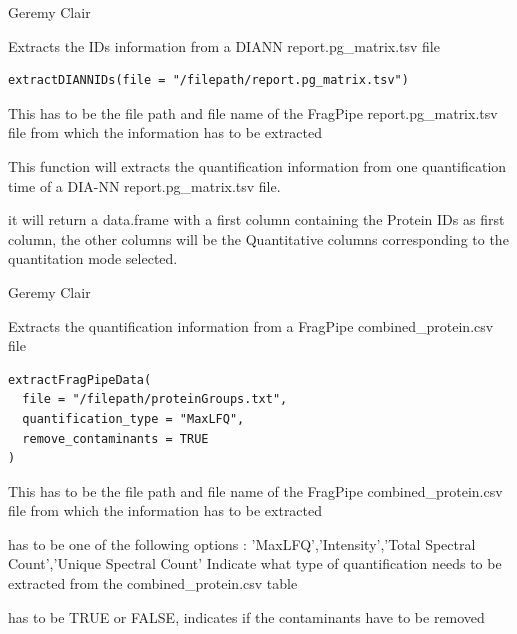 \documentclass[a4paper]{book}
\begin{document}
%
\begin{Author}
Geremy Clair
\end{Author}
%
\begin{Description}
Extracts the IDs information from a DIANN report.pg\_matrix.tsv file
\end{Description}
%
\begin{Usage}
\begin{verbatim}
extractDIANNIDs(file = "/filepath/report.pg_matrix.tsv")
\end{verbatim}
\end{Usage}
%
\begin{Arguments}
\begin{ldescription}
\item[\code{file}] This has to be the file path and file name of the FragPipe report.pg\_matrix.tsv file from which the information has to be extracted
\end{ldescription}
\end{Arguments}
%
\begin{Details}
This function will extracts the quantification information from one quantification time of a DIA-NN report.pg\_matrix.tsv file.
\end{Details}
%
\begin{Value}
it will return a data.frame with a first column containing the Protein IDs as first column, the other columns will be the Quantitative columns corresponding to the quantitation mode selected.
\end{Value}
%
\begin{Author}
Geremy Clair
\end{Author}
%
\begin{Description}
Extracts the quantification information from a FragPipe combined\_protein.csv file
\end{Description}
%
\begin{Usage}
\begin{verbatim}
extractFragPipeData(
  file = "/filepath/proteinGroups.txt",
  quantification_type = "MaxLFQ",
  remove_contaminants = TRUE
)
\end{verbatim}
\end{Usage}
%
\begin{Arguments}
\begin{ldescription}
\item[\code{file}] This has to be the file path and file name of the FragPipe combined\_protein.csv file from which the information has to be extracted

\item[\code{quantification\_type}] has to be one of the following options : 'MaxLFQ','Intensity','Total Spectral Count','Unique Spectral Count' Indicate what type of quantification needs to be extracted from the combined\_protein.csv table

\item[\code{remove\_contaminants}] has to be TRUE or FALSE, indicates if the contaminants have to be removed
\end{ldescription}
\end{Arguments}
\end{document}
